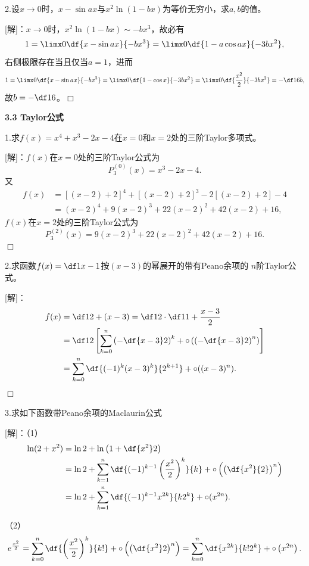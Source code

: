 \bigskip

2.设$x\to 0$时，$x-\sin ax$与$x^2\ln(1-bx)$为等价无穷小，求$a,b$的值。

[解]：$x\to 0$时，$x^2\ln(1-bx)\sim-bx^3$，故必有
$$1=\limx0\df{x-\sin ax}{-bx^3}
=\limx0\df{1-a\cos ax}{-3bx^2},$$
右侧极限存在当且仅当$a=1$，进而
$$1=\limx0\df{x-\sin ax}{-bx^3}
=\limx0\df{1-\cos x}{-3bx^2}
=\limx0\df{\frac{x^2}2}{-3bx^2}=-\df1{6b},$$
故$b=-\df16$。\hfill$\Box$

\begin{center}
	\bf 3.3 Taylor公式
\end{center}

\bigskip

1.求$f(x)=x^4+x^3-2x-4$在$x=0$和$x=2$处的三阶Taylor多项式。

[解]：$f(x)$在$x=0$处的三阶Taylor公式为
$$P^{(0)}_3(x)=x^3-2x-4.$$
又
\begin{align*}
	f(x)&=[(x-2)+2]^4+[(x-2)+2]^3-2[(x-2)+2]-4\\
	&=(x-2)^4+9(x-2)^3+22(x-2)^2+42(x-2)+16,
\end{align*}
$f(x)$在$x=2$处的三阶Taylor公式为
$$P^{(2)}_3(x)=9(x-2)^3+22(x-2)^2+42(x-2)+16.$$
\hfill$\Box$

\bigskip

2.求函数$f(x)=\df1{x-1}$按$(x-3)$的幂展开的带有Peano余项的
$n$阶Taylor公式。

[解]：
\begin{align*}
	f(x)&=\df1{2+(x-3)}=\df12\cdot\df1{1+\frac{x-3}2}\\
	&=\df12\left[\sum\limits_{k=0}^n\left(-\df{x-3}2\right)^k
	+\circ\left(\left(-\df{x-3}2\right)^n\right)\right]\\
	&=\sum\limits_{k=0}^n\df{(-1)^k(x-3)^k}{2^{k+1}}+\circ((x-3)^n).
\end{align*}
\hfill$\Box$

\bigskip

3.求如下函数带Peano余项的Maclaurin公式

[解]：（1）
\begin{align*}
	\ln(2+x^2)&=\ln2+\ln\left(1+\df{x^2}2\right)\\
	&=\ln2+\sum\limits_{k=1}^n\df{(-1)^{k-1}\left(\frac{x^2}{2}\right)^k}{k}
	+\circ\left(\left(\df{x^2}{2}\right)^n\right)\\
	&=\ln2+\sum\limits_{k=1}^n\df{(-1)^{k-1}x^{2k}}{k2^k}
	+\circ(x^{2n}).
\end{align*}

（2）
$$
	e^{\frac{x^2}2}
	=\sum\limits_{k=0}^n\df{\left(\frac{x^2}2\right)^k}{k!}
	+\circ\left(\left(\df{x^2}2\right)^n\right)
	=\sum\limits_{k=0}^n\df{x^{2k}}{k!2^k}
	+\circ\left(x^{2n}\right).
$$

